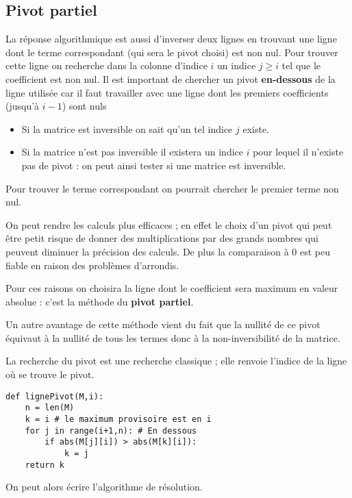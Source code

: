 \subsection{Pivot partiel}
La réponse algorithmique est aussi d'inverser deux lignes en trouvant une ligne dont le terme correspondant (qui sera le pivot choisi) est non nul. Pour trouver cette ligne on recherche dans la colonne d'indice $i$ un indice $j\ge i$ tel que le coefficient est non nul. Il est important de chercher un pivot {\bf en-dessous} de la ligne utilisée car il faut travailler avec une ligne dont les premiers coefficients (jusqu'à $i-1$) sont nuls
\begin{itemize}
\item Si la matrice est inversible on sait qu'un tel indice $j$ existe.

\item Si la matrice n'est pas inversible il existera un indice $i$ pour lequel il n'existe pas de pivot : on peut ainsi tester si une matrice est inversible.
\end{itemize}
Pour trouver le terme correspondant on pourrait chercher le premier terme non nul. 

On peut rendre les calculs plus efficaces ; en effet le choix d'un pivot qui peut être petit risque de donner des multiplications par des grands nombres qui peuvent diminuer la précision des calculs. De plus la comparaison à 0 est peu fiable en raison des problèmes d'arrondis. 

Pour ces raisons on choisira la ligne dont le coefficient sera maximum en valeur absolue : c'est la méthode du {\bf pivot partiel}.

Un autre avantage de cette méthode vient du fait que la nullité de ce pivot équivaut à la nullité de tous les termes donc à la non-inversibilité de la matrice.

\medskip

La recherche du pivot est une recherche classique ; elle renvoie l'indice de la ligne où se trouve le pivot.
\begin{lstlisting}
def lignePivot(M,i):
    n = len(M)
    k = i # le maximum provisoire est en i
    for j in range(i+1,n): # En dessous
        if abs(M[j][i]) > abs(M[k][i]):
            k = j 
    return k
\end{lstlisting}
On peut alors écrire l'algorithme de résolution.

